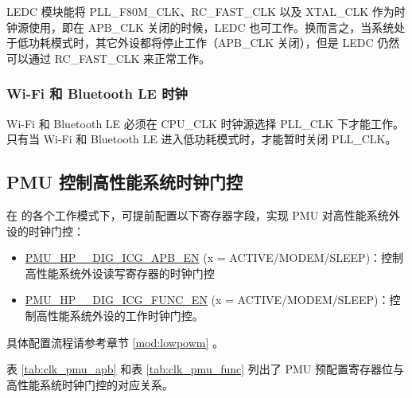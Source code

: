 \documentclass[main\_\_CN.tex]{subfiles}
\begin{document}
LEDC 模块能将 PLL\_F80M\_CLK、RC\_FAST\_CLK 以及 XTAL\_CLK 作为时钟源使用，即在 APB\_CLK 关闭的时候，LEDC 也可工作。换而言之，当系统处于低功耗模式时，其它外设都将停止工作（APB\_CLK 关闭），但是 LEDC 仍然可以通过 RC\_FAST\_CLK 来正常工作。

\subsubsection{Wi-Fi 和 Bluetooth LE 时钟}

Wi-Fi 和 Bluetooth LE 必须在 CPU\_CLK 时钟源选择 PLL\_CLK 下才能工作。只有当 Wi-Fi 和 Bluetooth LE 进入低功耗模式时，才能暂时关闭 PLL\_CLK。

\subsection{PMU 控制高性能系统时钟门控}

在 \chipname{} 的各个工作模式下，可提前配置以下寄存器字段，实现 PMU 对高性能系统外设的时钟门控：
\begin{itemize}
    \item \hyperref[fielddesc:PMUHPACTIVEDIGICGAPBEN]{PMU\_HP\_\_DIG\_ICG\_APB\_EN} (x = ACTIVE/MODEM/SLEEP)：控制高性能系统外设读写寄存器的时钟门控
    \item \hyperref[fielddesc:PMUHPACTIVEDIGICGFUNCEN]{PMU\_HP\_\_DIG\_ICG\_FUNC\_EN} (x = ACTIVE/MODEM/SLEEP)：控制高性能系统外设的工作时钟门控。
\end{itemize}

具体配置流程请参考章节 \ref{mod:lowpowm} \textit{}。

表 \ref{tab:clk_pmu_apb} 和表 \ref{tab:clk_pmu_func} 列出了 PMU 预配置寄存器位与高性能系统时钟门控的对应关系。
\end{document}

